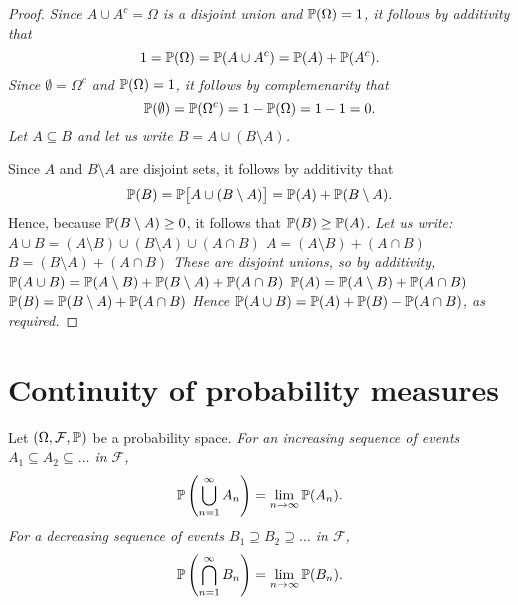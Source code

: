 \begin{proof}
\ben
\it %
Since $A\cup A^c=\Omega$ is a disjoint union and $\mathbb{P}(\Omega)=1$, it follows by additivity that 
\[
1 = \mathbb{P}(\Omega) = \mathbb{P}(A\cup A^c) = \mathbb{P}(A) + \mathbb{P}(A^c).
\]
\it %
Since $\emptyset=\Omega^c$ and $\mathbb{P}(\Omega)=1$, it follows by complemenarity that
\[
\mathbb{P}(\emptyset) = \mathbb{P}(\Omega^c) = 1 - \mathbb{P}(\Omega) = 1 - 1 = 0.
\]
\it %
Let $A\subseteq B$ and let us write $B = A\cup (B\setminus A)$. 

Since $A$ and $B\setminus A$ are disjoint sets, it follows by additivity that
\[
\mathbb{P}(B) = \mathbb{P}\big[A\cup (B\setminus A)\big] = \mathbb{P}(A) + \mathbb{P}(B\setminus A).
\]
Hence, because $\mathbb{P}(B\setminus A)\geq 0$, it follows that $\mathbb{P}(B) \geq \mathbb{P}(A)$.
\it %
Let us write:
\bit
\it $A\cup B = (A\setminus B) \cup (B\setminus A) \cup (A\cap B)$
\it $A 		 = (A\setminus B) + (A\cap B)$
\it $B 		 = (B\setminus A) + (A\cap B)$
\eit
These are disjoint unions, so by additivity, 
\bit
\it $\mathbb{P}(A\cup B) = \mathbb{P}(A\setminus B) + \mathbb{P}(B\setminus A) + \mathbb{P}(A\cap B)$
\it $\mathbb{P}(A) 		= \mathbb{P}(A\setminus B) + \mathbb{P}(A\cap B)$
\it $\mathbb{P}(B)		= \mathbb{P}(B\setminus A) + \mathbb{P}(A\cap B)$
\eit
Hence $\mathbb{P}(A\cup B) = \mathbb{P}(A) + \mathbb{P}(B) - \mathbb{P}(A\cap B)$, as required.
\een
\end{proof}

\section{Continuity of probability measures}

\begin{theorem}\label{thm:continuity_of_probability_measures}
Let $(\Omega,\mathcal{F},\mathbb{P})$ be a probability space.
\ben
\it For an increasing sequence of events $A_1\subseteq A_2\subseteq \ldots$ in $\mathcal{F}$, 
\[
\mathbb{P}\left(\bigcup_{n=1}^{\infty} A_n\right) = \lim_{n\to\infty}\mathbb{P}(A_n).
\]
\it For a decreasing sequence of events $B_1\supseteq B_2\supseteq \ldots$ in $\mathcal{F}$, 
\[
\mathbb{P}\left(\bigcap_{n=1}^{\infty} B_n\right) = \lim_{n\to\infty}\mathbb{P}(B_n).
\]
\een
\end{theorem}

